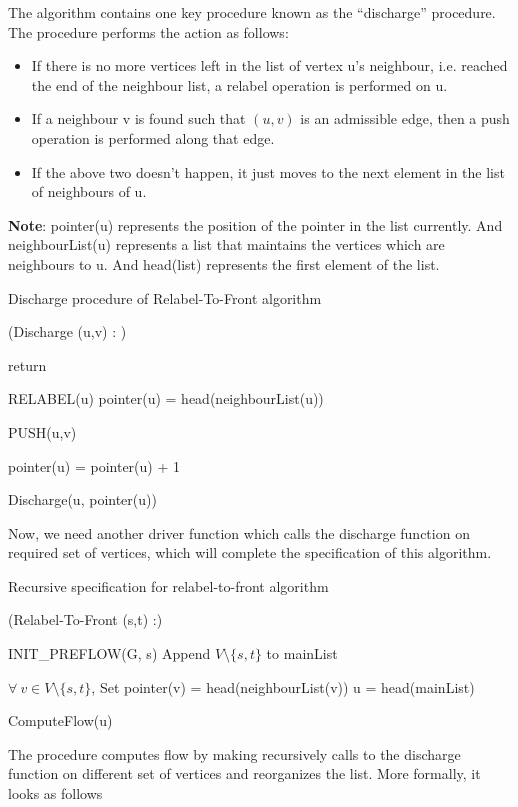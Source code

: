 \documentclass[BTech]{iitmdiss}
\begin{document}
	      The algorithm contains one key procedure known as the ``discharge'' procedure. The procedure performs the action as follows:
	      \begin{itemize}
	       \item 
		If there is no more vertices left in the list of vertex u's neighbour, i.e. reached the end of the neighbour list, a relabel operation
		is performed on u.
		\item	
		  If a neighbour v is found such that $(u,v)$ is an admissible edge, then a push operation is performed along that edge.
		\item
		  If the above two doesn't happen, it just moves to the next element in the list of neighbours of u.
	      \end{itemize}
	      
	      \textbf{Note}: pointer(u) represents the position of the pointer in the list currently. And neighbourList(u) represents a list that 
	      maintains the vertices which are neighbours to u. And head(list) represents the first element of the list. \\
	      
	      \begin{algorithm}[H]
	       \caption{Discharge procedure of Relabel-To-Front algorithm}
	       \Begin(Discharge {(u,v) :} )
	       {
		  {
		      return \;
		  
		  }
		  {
		      RELABEL(u) \;
		      pointer(u) = head(neighbourList(u)) \;
		  }
		  {
		      PUSH(u,v) \;
		  
		  }
		  \Else
		  {
		    pointer(u) = pointer(u) + 1 \;
		  
		  }
		  Discharge(u, pointer(u)) \;
	       }
	      \end{algorithm}
	      
	      Now, we need another driver function which calls the discharge function on required set of vertices, which will complete the specification
	      of this algorithm. \\
	      
	      \begin{algorithm}[H]
		\caption{Recursive specification for relabel-to-front algorithm}
		\Begin(Relabel-To-Front {(s,t)} :){
		    INIT\_PREFLOW(G, s) \;
		    Append $V \setminus \{s,t\}$ to mainList \;
		    
		    $\forall~v \in V \setminus \{s,t\}$, Set pointer(v) = head(neighbourList(v)) \;
		    u = head(mainList) \;
		    
		    ComputeFlow(u) \;
		}
	       
	      \end{algorithm}
	      The procedure computes flow by making recursively calls to the discharge function on different set of vertices and reorganizes the list. More formally,
	      it looks as follows \\
	      
\end{document}
